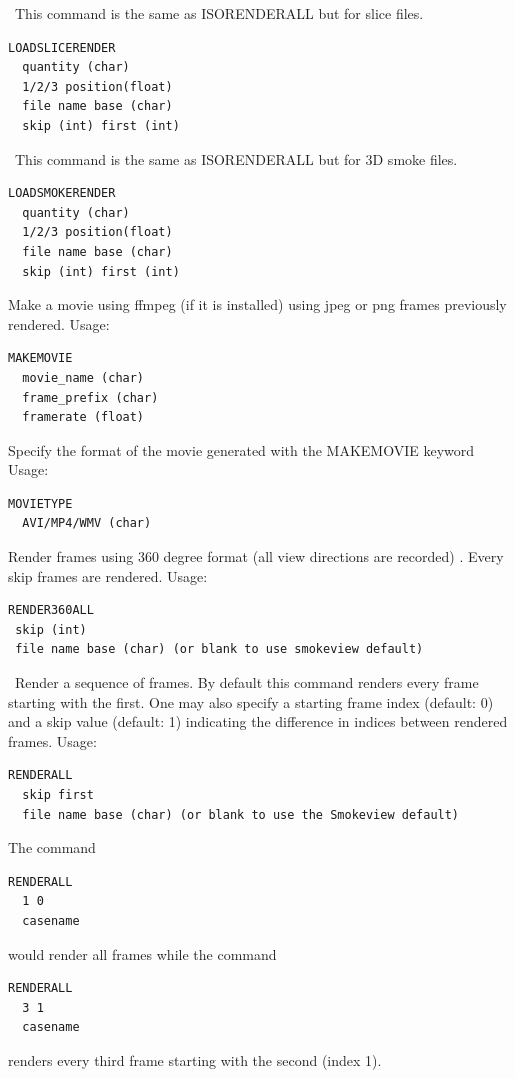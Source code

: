 \documentclass[11pt,twoside]{book}
\begin{document}
\ This command is the same as ISORENDERALL but for slice files.

\begin{lstlisting}
LOADSLICERENDER
  quantity (char)
  1/2/3 position(float)
  file name base (char)
  skip (int) first (int)
\end{lstlisting}

\ This command is the same as ISORENDERALL but for 3D smoke files.

\begin{lstlisting}
LOADSMOKERENDER
  quantity (char)
  1/2/3 position(float)
  file name base (char)
  skip (int) first (int)
\end{lstlisting}

Make a movie using ffmpeg (if it is installed) using jpeg or png frames
previously rendered.
Usage:
\begin{lstlisting}
MAKEMOVIE
  movie_name (char)
  frame_prefix (char)
  framerate (float)
\end{lstlisting}

Specify the format of the movie generated with the MAKEMOVIE keyword
Usage:
\begin{lstlisting}
MOVIETYPE
  AVI/MP4/WMV (char)
\end{lstlisting}

Render frames using 360 degree format (all view directions are recorded) .
Every skip frames are rendered.  Usage:
\begin{lstlisting}
RENDER360ALL
 skip (int)
 file name base (char) (or blank to use smokeview default)
\end{lstlisting}

\ Render a sequence of frames.  By default this
command renders every frame starting with the first. One may also
specify a starting frame index (default: 0) and a skip value
(default: 1) indicating the difference in indices between rendered
frames. Usage:
\begin{lstlisting}
RENDERALL
  skip first
  file name base (char) (or blank to use the Smokeview default)
\end{lstlisting}

The command
\begin{lstlisting}
RENDERALL
  1 0
  casename
\end{lstlisting}
would render all frames while the command
\begin{lstlisting}
RENDERALL
  3 1
  casename
\end{lstlisting}
renders every third frame starting with the second (index 1).
\end{document}
